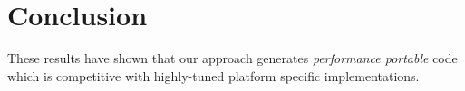 \section{Conclusion}

These results have shown that our approach generates \emph{performance portable} code which is competitive with highly-tuned platform specific implementations.

%














